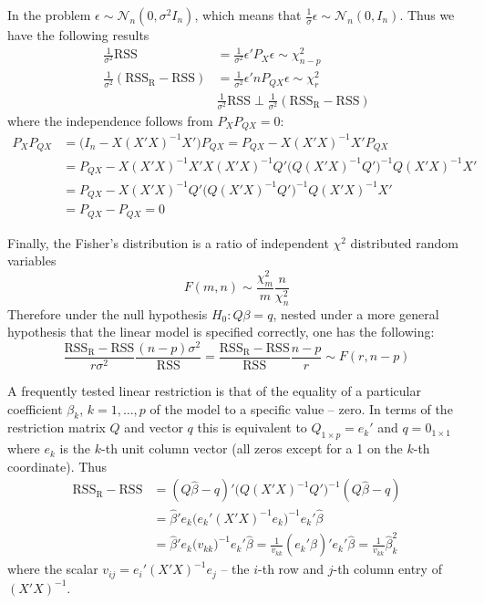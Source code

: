 \documentclass[a4paper]{article}
\newcommand{\R}{\text{R}}
\newcommand{\RSS}{\text{RSS}}
\begin{document}
In the problem $\epsilon\sim\mathcal{N}_n(0,\sigma^2 I_n)$, which means that $\frac{1}{\sigma} \epsilon \sim \mathcal{N}_n(0,I_n)$. Thus we have the following results
\begin{align*}
	\frac{1}{\sigma^2}\RSS &= \frac{1}{\sigma^2}\epsilon'P_X \epsilon \sim \chi^2_{n-p} \\
	\frac{1}{\sigma^2}(\RSS_\R - \RSS) &= \frac{1}{\sigma^2}\epsilon'n P_{QX} \epsilon \sim \chi^2_r \\
	& \frac{1}{\sigma^2}\RSS \perp \frac{1}{\sigma^2}(\RSS_\R - \RSS)
\end{align*}
where the independence follows from $P_X P_{QX} = 0$:
\begin{align*}
	P_X P_{QX} &= \big(I_n - X(X'X)^{-1}X'\big) P_{QX} = P_{QX} - X(X'X)^{-1}X' P_{QX} \\
	&= P_{QX} - X(X'X)^{-1}X'X(X'X)^{-1}Q'\big(Q(X'X)^{-1}Q'\big)^{-1}Q(X'X)^{-1}X' \\
	&= P_{QX} - X(X'X)^{-1}Q'\big(Q(X'X)^{-1}Q'\big)^{-1}Q(X'X)^{-1}X' \\
	&= P_{QX} - P_{QX} = 0
\end{align*}

Finally, the Fisher's distribution is a ratio of independent $\chi^2$ distributed random variables
\[F(m,n) \sim \frac{\chi^2_m}{m} \frac{n}{\chi^2_n}\]
Therefore under the null hypothesis $H_0: Q\beta = q$, nested under a more general hypothesis that the linear model is specified correctly, one has the following:
\[\frac{\RSS_\R - \RSS}{r \sigma^2}\frac{(n-p) \sigma^2}{\RSS} = \frac{\RSS_\R - \RSS}{\RSS}\frac{n-p}{r}\sim F(r,n-p)\]

A frequently tested linear restriction is that of the equality of a particular coefficient $\beta_k$, $k=1,\ldots,p$ of the model to a specific value -- zero. In terms of the restriction matrix $Q$ and vector $q$ this is equivalent to $Q_{1\times p} = e_k'$ and $q=0_{1\times 1}$ where $e_k$ is the $k$-th unit column vector (all zeros except for a 1 on the $k$-th coordinate). Thus
\begin{align*}
	\RSS_\R - \RSS
	&= (Q\hat{\beta}-q)'\big(Q(X'X)^{-1}Q'\big)^{-1}(Q\hat{\beta}-q) \\
	&= \hat{\beta}'e_k\big(e_k'(X'X)^{-1}e_k\big)^{-1}e_k'\hat{\beta} \\
	&= \hat{\beta}'e_k\big(v_{kk}\big)^{-1}e_k'\hat{\beta} = \frac{1}{v_{kk}}(e_k'\hat{\beta})' e_k'\hat{\beta} = \frac{1}{v_{kk}}\hat{\beta}_k^2
\end{align*}
where the scalar $v_{ij} = e_i'(X'X)^{-1}e_j$ -- the $i$-th row and $j$-th column entry of $(X'X)^{-1}$.
\end{document}
